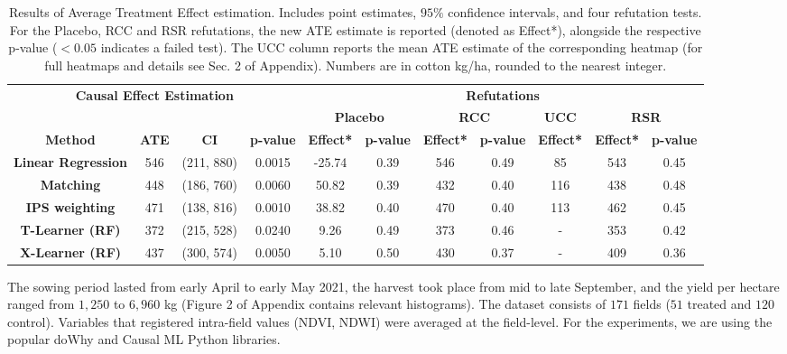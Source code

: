\documentclass[letterpaper]{article} %
\begin{document}
\begin{table}[!ht]
\small
\centering
\begin{tabular}{cccccccccccc}
\toprule
\multicolumn{4}{c}{\multirow{2}{*}{\textbf{Causal Effect Estimation}}} & \multicolumn{8}{c}{\textbf{Refutations}}                                              \\ \cmidrule(l){5-12} 
\multicolumn{4}{c}{} &
  \multicolumn{2}{c}{\textbf{Placebo}} &
  \multicolumn{2}{c}{\textbf{RCC}} &
  \multicolumn{2}{c}{\textbf{UCC}} &
  \multicolumn{2}{c}{\textbf{RSR}} \\ \midrule
\textbf{Method} & \textbf{ATE} & \textbf{CI} &  \textbf{p-value} 
& \textbf{Effect*} & \textbf{p-value} & \textbf{Effect*} &
  \textbf{p-value} &   \multicolumn{2}{c}{\textbf{Effect*}} &
  \textbf{Effect*} & \textbf{p-value} \\ 
  \midrule
\textbf{Linear Regression}   & 546   & (211, 880)   & 0.0015  & -25.74 & 0.39 & 546 & 0.49  & \multicolumn{2}{c}{85} & 543 & 0.45 \\
\textbf{Matching}            & 448   & (186, 760)   & 0.0060   & 50.82 & 0.39 & 432  & 0.40 & \multicolumn{2}{c}{116} & 438 & 0.48 \\
\textbf{IPS weighting} &  471 &  (138, 816) &  0.0010 &  38.82 &  0.40 &  470 &  0.40 &  \multicolumn{2}{c}{113} &  462 &  0.45 \\
\textbf{T-Learner (RF)}      & 372   & (215, 528)   & 0.0240 & 9.26  & 0.49 & 373 & 0.46 & \multicolumn{2}{c}{-} & 353 & 0.42 \\
\textbf{X-Learner (RF)}      & 437   & (300, 574)   & 0.0050 & 5.10   & 0.50 & 430 & 0.37 & \multicolumn{2}{c}{-} & 409    & 0.36 \\ \bottomrule
\end{tabular}
\caption{Results of Average Treatment Effect estimation. Includes point estimates, $95\%$ confidence intervals, and four refutation tests. For the Placebo, RCC and RSR refutations, the new ATE estimate is reported (denoted as Effect*), alongside the respective p-value ($<0.05$ indicates a failed test). The UCC column reports the mean ATE estimate of the corresponding heatmap (for full heatmaps and details see Sec. 2 of Appendix). Numbers are in cotton kg/ha, rounded to the nearest integer.}
\label{tab:results}
\end{table}

The sowing period lasted from early April to early May 2021, the harvest took place from mid to late September, and the yield per hectare ranged from $1,250$ to $6,960$ kg (Figure 2 of Appendix contains relevant histograms).
The dataset consists of $171$ fields ($51$ treated and $120$ control). 
Variables that registered intra-field values (NDVI, NDWI) were averaged at the field-level. For the experiments, we are using the popular doWhy \cite{sharma2020dowhy} and Causal ML \cite{chen2020causalml} Python libraries.
\end{document}
